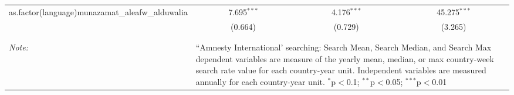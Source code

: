 \begin{table}[!htbp]
\begin{tabular}{@{\extracolsep{5pt}}lccc}
  as.factor(language)munazamat\_aleafw\_alduwalia & 7.695$^{***}$ & 4.176$^{***}$ & 45.275$^{***}$ \\ 
  & (0.664) & (0.729) & (3.265) \\ 
 \hline \\[-1.8ex] 
\hline 
\hline \\[-1.8ex] 
\textit{Note:}  & \multicolumn{3}{l}{\parbox[t]{8cm}{``Amnesty International' searching: Search Mean, Search Median, and Search Max dependent variables are measure of the yearly mean, median, or max country-week search rate value for each country-year unit. Independent variables are measured annually for each country-year unit. $^{*}$p$<$0.1; $^{**}$p$<$0.05; $^{***}$p$<$0.01}} \\ 
\end{tabular} 
\end{table} 
